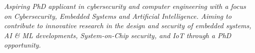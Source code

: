 \begin{rSection}
    \emph{Aspiring PhD applicant in cybersecurity and computer engineering with a focus on Cybersecurity, Embedded Systems and Artificial Intelligence.
    Aiming to contribute to innovative research in the design and security of embedded systems, AI \& ML developments, System-on-Chip
    security, and IoT through a PhD opportunity.}
\end{rSection}